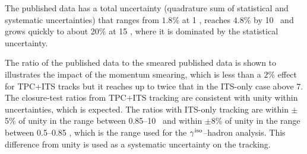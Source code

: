 The published data has a total uncertainty (quadrature sum of statistical and systematic uncertainties) that ranges from $1.8\%$ at 1 \GeVc, reaches $4.8\%$ by 10 \GeVc~and grows quickly to about 20$\%$ at 15 \GeVc, where it is dominated by the statistical uncertainty. 

The ratio of the published data to the smeared published data is shown to illustrates the impact of the momentum smearing, which is less than a $2\%$ effect for TPC+ITS tracks but it reaches up to twice that in the ITS-only case above 7\GeVc. The closure-test ratios from TPC+ITS tracking are consistent with unity within uncertainties, which is expected. The ratios with ITS-only tracking are within $\pm$5\% of unity in the range between 0.85--10 \GeVc~and within $\pm$8\% of unity in the range between 0.5--0.85 \GeVc, which is the range used for the $\gamma^\mathrm{iso}$--hadron analysis. This difference from unity is used as a systematic uncertainty on the tracking.

